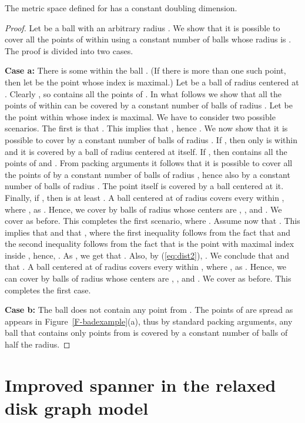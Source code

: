\documentclass[proceedings]{stacs}
\theoremstyle{plain}\newtheorem{satz}[thm]{Satz}
\theoremstyle{definition}\newtheorem{crucial}[thm]{Crucial Definition}
\begin{document}
\begin{theorem}
The metric space  defined for  has a constant
doubling dimension.
\end{theorem}
\begin{proof}
Let  be a ball with an arbitrary radius . We show that it is
possible to cover all the points of  within  using a
constant number of balls whose radius is . The proof is
divided into two cases.

{\bf Case a:} There is some  within the ball . (If
there is more than one such point, then let  be the point
whose index is maximal.) Let  be a ball of radius 
centered at . Clearly , so  contains all the
points of . In what follows we show that all the points of
 within  can be covered by a constant number of balls
of radius . Let  be the point within  whose index is
maximal.  We have to consider two possible scenarios. The first is
that . This implies that , hence . We now show that it is
possible to cover  by a constant number of balls of radius
. If , then only  is within  and it is
covered by a ball of radius  centered at itself. If , then  contains all the points of 
and . From packing arguments it follows that it is possible
to cover all the points of  by a constant number of balls of
radius , hence also by a constant number of balls of radius
. The point  itself is covered by a ball centered at
it. Finally, if , then  is
at least .
A ball centered at  of radius  covers every 
within , where , as . Hence, we cover  by balls of radius 
whose centers are , ,  and . We
cover  as before. This completes the first scenario,
where . Assume now that . This implies
that  and that ,
where the first inequality follows from the fact that 
and the second inequality follows from the fact that  is the
point with maximal index inside , hence, .
As , we get that
. Also, by (\ref{eq:dist2}),
. We conclude that  and that . A ball centered at
 of radius  covers every  within , where
, as . Hence, we can
cover  by balls of radius  whose centers are ,
,  and . We cover  as before.
This completes the first case.

{\bf Case b:} The ball  does not contain any point from .
The points of  are spread as appears in
Figure~\ref{F-badexample}(a), thus by standard packing arguments,
any ball that contains only points from  is covered by a
constant number of balls of half the radius.
\end{proof}

\section{Improved spanner in the relaxed disk graph model}
\label{s:DG-3}
\end{document}
